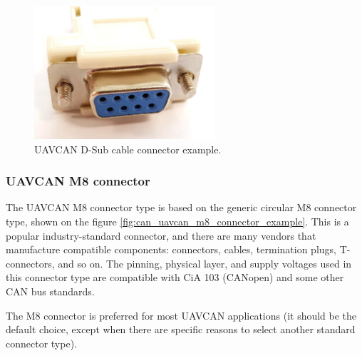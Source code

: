 \begin{figure}[hbt]
    \centering
    \includegraphics[width=0.6\textwidth]{physical_layer/can/de-9_cable_female_socket}
    \caption{UAVCAN D-Sub cable connector example.
    \label{fig:can_uavcan_d_sub_connector_cable}}
\end{figure}

\clearpage  %
\subsubsection{UAVCAN M8 connector}

The UAVCAN M8 connector type is based on the generic circular M8 connector type,
shown on the figure \ref{fig:can_uavcan_m8_connector_example}.
This is a popular industry-standard connector, and there are many vendors that manufacture compatible components:
connectors, cables, termination plugs, T-connectors, and so on.
The pinning, physical layer, and supply voltages used in this connector type are compatible with CiA 103 (CANopen)
and some other CAN bus standards.

The M8 connector is preferred for most UAVCAN applications (it should be the default choice,
except when there are specific reasons to select another standard connector type).

